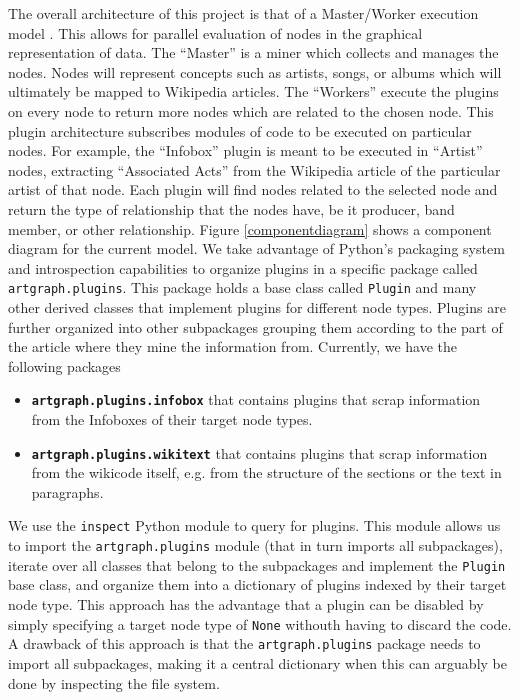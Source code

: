 \documentclass{sig-alternate}
\begin{document}
The overall architecture of this project is that of a Master/Worker execution model \cite{Garg:2001:TOA:558986}.
This allows for parallel evaluation of nodes in the graphical representation of data. 
The ``Master'' is a miner which collects and manages the nodes. Nodes will represent 
concepts such as artists, songs, or albums which will ultimately be mapped to Wikipedia 
articles. The ``Workers'' execute the plugins on every node to return more nodes which are 
related to the chosen node. This plugin architecture subscribes modules of code to be 
executed on particular nodes. For example, the ``Infobox'' plugin is meant to be executed 
in ``Artist'' nodes, extracting ``Associated Acts'' from the Wikipedia article of the particular 
artist of that node. Each plugin will find nodes related to the selected node and return 
the type of relationship that the nodes have, be it producer, band member, or other relationship. Figure
\ref{componentdiagram} shows a component diagram for the current model. We take advantage of Python's packaging system
and introspection capabilities to organize plugins in a specific package called {\tt artgraph.plugins}. This package
holds a base class called {\tt Plugin} and many other derived classes that implement plugins for different node
types. Plugins are further organized into other subpackages grouping them according to the part of the article where they
mine the information from. Currently, we have the following packages

\begin{itemize}
\item \textbf{\tt artgraph.plugins.infobox} that contains plugins that scrap information from the Infoboxes of their target
  node types.
\item \textbf{\tt artgraph.plugins.wikitext} that contains plugins that scrap information from the wikicode itself,
  e.g. from the structure of the sections or the text in paragraphs.
\end{itemize}

We use the {\tt inspect} Python module to query for plugins. This module allows us to import the {\tt artgraph.plugins}
module (that in turn imports all subpackages), iterate over all classes that  belong to the subpackages and implement
the {\tt Plugin} base  class, and organize them into a dictionary of plugins indexed by their target node type. This
approach has the advantage that a plugin can be disabled by simply specifying a target node type of {\tt None} withouth
having to discard the code. A drawback of this approach is that the {\tt artgraph.plugins} package needs to import all
subpackages, making it a central dictionary when this can arguably be done by inspecting the file system.
\end{document}
